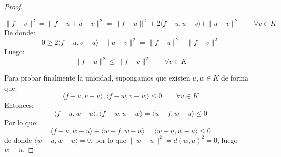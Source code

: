 \begin{teo}[de la Proyección]
\begin{proof}
\begin{description}
\begin{equation*}
                    \|f-v\|^2 = \|f-u+u-v\|^2 = \|f-u\|^2 + 2\langle f-u,u-v \rangle  + \|u-v\|^2 \qquad \forall v\in K
                \end{equation*}
                De donde:
                \begin{equation*}
                    0\geq 2\langle f-u,v-u \rangle  - \|u-v\|^2 = \|f-u\|^2 - \|f-v\|^2
                \end{equation*}
                Luego:
                \begin{equation*}
                    \|f-u\|^2 \leq \|f-v\|^2 \qquad \forall v\in K
                \end{equation*}
        \end{description}
        Para probar finalmente la unicidad, supongamos que existen $u,w\in K$ de forma que:
        \begin{equation*}
            \langle f-u,v-u \rangle ,\langle f-w,v-w \rangle \leq 0 \qquad \forall v\in K
        \end{equation*}
        Entonces:
        \begin{equation*}
            \langle f-u,w-u \rangle , \langle f-w,u-w \rangle = \langle u-f,w-u \rangle  \leq 0
        \end{equation*}
        Por lo que:
        \begin{equation*}
            \langle f-u,w-u \rangle  + \langle w-f, w-u \rangle  = \langle w-u, w-u \rangle  \leq 0
        \end{equation*}
        de donde $\langle w-u,w-u \rangle = 0$, por lo que $\|w-u\|^2 = d(w,u)^2 = 0$, luego $w=u$.
    \end{proof}
\end{teo}

